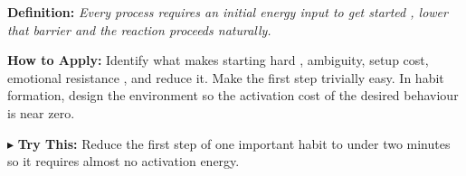 \begin{tcolorbox}[title={\small \textbf{33 | Activation Energy}},
  colback=blue!5!white, colframe=blue!40!black,
  fonttitle=\bfseries\small, boxrule=0.5pt]
\textbf{Definition:} \textit{Every process requires an initial energy input to get started , lower that barrier and the reaction proceeds naturally.}

\medskip
\textbf{How to Apply:} Identify what makes starting hard , ambiguity, setup cost, emotional resistance , and reduce it. Make the first step trivially easy. In habit formation, design the environment so the activation cost of the desired behaviour is near zero.

\medskip
$\blacktriangleright$ \textbf{Try This:} Reduce the first step of one important habit to under two minutes so it requires almost no activation energy.
\end{tcolorbox}

